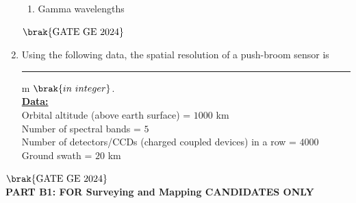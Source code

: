 \documentclass[journal,12pt,onecolumn]{IEEEtran}
\theoremstyle{remark}
\begin{document}
\begin{enumerate}
\begin{enumerate}
\item Gamma wavelengths
\end{enumerate}
\hfill $\brak{\text{GATE GE 2024}}$
\bigskip
\item Using the following data, the spatial resolution of a push-broom sensor is \rule{2cm}{0.5mm} m $\brak{in\ integer}$.
\\
\underline{\textbf{Data:}} \\
Orbital altitude (above earth surface) = $1000$ km \\
Number of spectral bands = $5$ \\
Number of detectors/CCDs (charged coupled devices) in a row = $4000$ \\
Ground swath = $20$ km
\end{enumerate}
\hfill $\brak{\text{GATE GE 2024}}$
\bigskip
\\
\textbf{PART B1: FOR Surveying and Mapping CANDIDATES ONLY}\\
\end{document}
